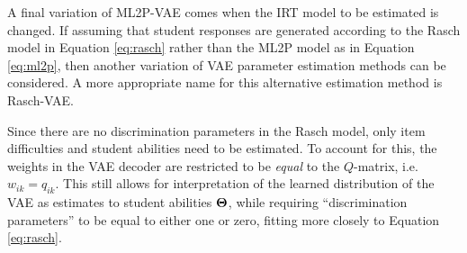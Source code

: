 A final variation of ML2P-VAE comes when the IRT model to be estimated is changed. If assuming that student responses are generated according to the Rasch model in Equation \ref{eq:rasch} rather than the ML2P model as in Equation \ref{eq:ml2p}, then another variation of VAE parameter estimation methods can be considered. A more appropriate name for this alternative estimation method is Rasch-VAE.

Since there are no discrimination parameters in the Rasch model, only item difficulties and student abilities need to be estimated. To account for this, the weights in the VAE decoder are restricted to be \textit{equal} to the $Q$-matrix, i.e. $w_{ik} = q_{ik}$. This still allows for interpretation of the learned distribution of the VAE as estimates to student abilities $\boldsymbol{\Theta}$, while requiring ``discrimination parameters'' to be equal to either one or zero, fitting more closely to Equation \ref{eq:rasch}.


